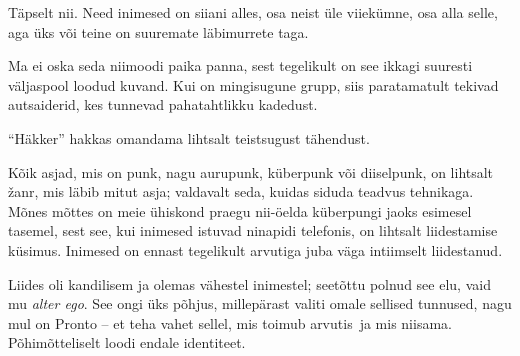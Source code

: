 
Täpselt nii. Need inimesed on siiani 
alles, osa neist üle viiekümne, osa alla selle, aga üks või teine on suuremate 
läbimurrete taga.


Ma ei oska seda niimoodi paika panna, sest tegelikult on see 
ikkagi suuresti väljaspool loodud kuvand. Kui on mingisugune grupp, 
siis paratamatult tekivad autsaiderid, kes tunnevad pahatahtlikku 
kadedust. 


\enquote{Häkker} hakkas omandama lihtsalt teistsugust tähendust.


Kõik asjad, mis on punk, nagu aurupunk, küberpunk või diiselpunk, on lihtsalt 
žanr, mis läbib mitut asja; valdavalt seda, kuidas siduda teadvus 
tehnikaga. Mõnes mõttes on meie ühiskond praegu nii-öelda küberpungi jaoks 
esimesel tasemel, sest see, kui inimesed istuvad ninapidi telefonis, on 
lihtsalt liidestamise küsimus. Inimesed on ennast tegelikult arvutiga juba väga 
intiimselt liidestanud.


Liides oli kandilisem ja olemas vähestel inimestel; seetõttu polnud see elu, vaid 
mu \emph{alter ego}. See ongi üks põhjus, millepärast valiti omale sellised
tunnused, nagu mul on Pronto -- et teha vahet sellel, mis toimub arvutis ja mis 
niisama. Põhimõtteliselt loodi endale identiteet. 

